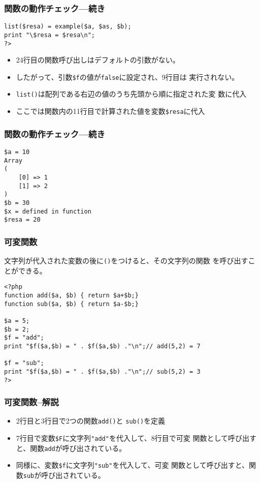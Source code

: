 \begin{frame}[containsverbatim]
\frametitle{関数の動作チェック---続き}
\begin{Verbatim}
list($resa) = example($a, $as, $b);
print "\$resa = $resa\n";
?>
\end{Verbatim}
\begin{itemize}
 \item 24行目の関数呼び出しはデフォルトの引数がない。
 \item したがって、引数\verb+$f+の値が\texttt{false}に設定され、9行目は
       実行されない。
 \item \texttt{list()}は配列である右辺の値のうち先頭から順に指定された変
       数に代入
 \item ここでは関数内の11行目で計算された値を変数\verb+$resa+に代入
\end{itemize}
\end{frame}
\begin{frame}[containsverbatim]
\frametitle{関数の動作チェック---続き}
\begin{Verbatim}
$a = 10
Array
(
    [0] => 1
    [1] => 2
)
$b = 30
$x = defined in function
$resa = 20
\end{Verbatim}
\end{frame}
 \begin{frame}[containsverbatim]
  \frametitle{可変関数}
 文字列が代入された変数の後に\texttt{()}をつけると、その文字列の関数
  を呼び出すことができる。
  {\small
\begin{Verbatim}
<?php
function add($a, $b) { return $a+$b;}
function sub($a, $b) { return $a-$b;}

$a = 5;
$b = 2;
$f = "add";
print "$f($a,$b) = " . $f($a,$b) ."\n";// add(5,2) = 7

$f = "sub";
print "$f($a,$b) = " . $f($a,$b) ."\n";// sub(5,2) = 3
?>
\end{Verbatim}
  }
 \end{frame}
  \begin{frame}[containsverbatim]
  \frametitle{可変関数--解説}
\begin{itemize}
\item 2行目と3行目で2つの関数\texttt{add()}と
       \texttt{sub()}を定義
 \item 7行目で変数\Verb+$F+に文字列\verb+"add"+を代入して、8行目で可変
       関数として呼び出すと、関数\texttt{add}が呼び出されている。
 \item 同様に、変数\Verb+$f+に文字列\Verb+"sub"+を代入して、可変
       関数として呼び出すと、関数\texttt{sub}が呼び出されている。
\end{itemize}
\end{frame}
